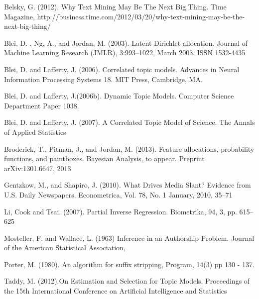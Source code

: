 \documentclass[12pt]{article}
\begin{document}


\begin{thebibliography}{99}

 Belsky, G. (2012). Why Text Mining May Be The Next Big Thing. Time Magazine, http://business.time.com/2012/03/20/why-text-mining-may-be-the-next-big-thing/

 Blei, D. , Ng, A., and Jordan, M. (2003). Latent Dirichlet allocation. Journal of Machine Learning Research (JMLR), 3:993–1022, March 2003. ISSN 1532-4435

 Blei, D. and Lafferty, J. (2006). Correlated topic models. Advances in Neural Information Processing Systems 18. MIT Press, Cambridge, MA.

 Blei, D. and Lafferty, J.(2006b). Dynamic Topic Models. Computer Science Department Paper 1038.

  Blei, D. and Lafferty, J. (2007). A Correlated Topic Model of Science. The Annals of Applied Statistics

 Broderick, T.,  Pitman, J.,  and Jordan, M. (2013). Feature allocations, probability functions, and paintboxes. Bayesian Analysis, to appear. Preprint arXiv:1301.6647, 2013

 Gentzkow, M., and  Shapiro, J. (2010). What Drives Media Slant? Evidence from U.S. Daily Newspapers. Econometrica, Vol. 78, No. 1 January, 2010, 35–71

  Li, Cook  and Tsai. (2007). Partial Inverse Regression. Biometrika, 94, 3, pp. 615–625

 Mosteller, F. and Wallace, L. (1963) Inference in an Authorship Problem. Journal of the American Statistical Association, 

 Porter, M. (1980). An algorithm for suffix stripping, Program, 14(3) pp 130 - 137.

 Taddy, M. (2012).On Estimation and Selection for Topic Models.  Proceedings of the 15th International Conference on Artificial Intelligence and Statistics


\end{thebibliography}
\end{document}
